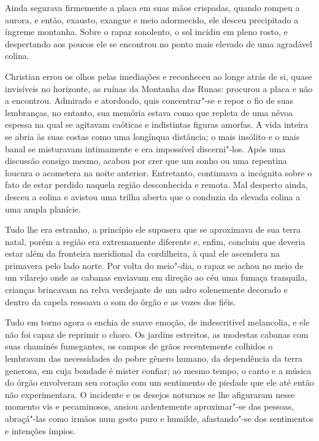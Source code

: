 Ainda segurava firmemente a placa em suas mãos crispadas,
quando rompeu a aurora, e então, exausto, exangue e meio adormecido,
ele desceu precipitado a íngreme montanha. Sobre o rapaz sonolento, 
o sol incidiu em pleno rosto, e despertando aos poucos ele se encontrou 
no ponto mais elevado de uma agradável colina.

Christian errou os olhos pelas imediações e reconheceu ao longe atrás de
si, quase invisíveis no horizonte, as ruínas da Montanha das Runas:
procurou a placa e não a encontrou. Admirado e atordoado, quis
concentrar"-se e repor o fio de suas lembranças, no entanto, sua memória
estava como que repleta de uma névoa espessa na qual se agitavam
caóticas e indistintas figuras amorfas. A vida inteira se abria às suas
costas como uma longínqua distância; o mais insólito e o mais banal se
misturavam intimamente e era impossível discerni"-los. Após uma
discussão consigo mesmo, acabou por crer que um sonho ou uma repentina
loucura o acometera na noite anterior. Entretanto, continuava a
incógnita sobre o fato de estar perdido naquela região desconhecida e
remota. Mal desperto ainda, desceu a colina e avistou uma trilha aberta
que o conduzia da elevada colina a uma ampla planície.

Tudo lhe era estranho, a princípio ele supusera que se aproximava de sua
terra natal, porém a região era extremamente diferente e, enfim,
concluiu que \mbox{deveria} estar além da fronteira meridional da cordilheira,
à qual ele ascendera na primavera pelo lado norte. Por volta do
meio"-dia, o rapaz se achou no meio de um vilarejo onde as cabanas
enviavam em direção ao céu uma fumaça tranquila, crianças brincavam na
relva verdejante de um adro solenemente decorado e dentro da capela
ressoava o som do órgão e as vozes dos fiéis.

Tudo em torno agora o enchia de suave emoção, de indescritível
melancolia, e ele não foi capaz de reprimir o choro. Os jardins
estreitos, as modestas cabanas com suas chaminés fumegantes, os campos
de grãos recentemente colhidos o lembravam das necessidades do pobre
gênero humano, da dependência da terra generosa, em cuja bondade é
mister confiar; ao mesmo tempo, o canto e a música do órgão envolveram
seu coração com um sentimento de piedade que ele até então não
experimentara. O incidente e os desejos noturnos se lhe afiguraram
nesse momento vis e pecaminosos, ansiou ardentemente aproximar"-se das
pessoas, abraçá"-las como irmãos num gesto puro e humilde, afastando"-se
dos sentimentos e intenções ímpios.

